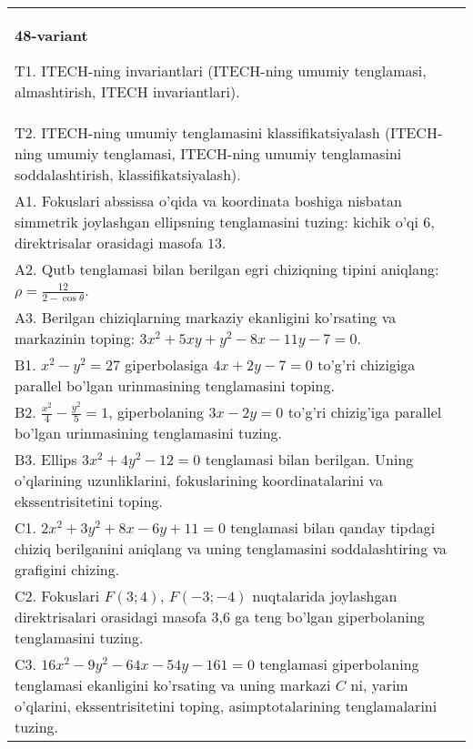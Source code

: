 \documentclass{article}
\begin{document}
\begin{tabular}{m{17cm}}
\textbf{48-variant}
\newline

T1. ITECH-ning invariantlari (ITECH-ning umumiy tenglamasi, almashtirish, ITECH invariantlari).\\

T2. ITECH-ning umumiy tenglamasini klassifikatsiyalash (ITECH-ning umumiy tenglamasi, ITECH-ning umumiy tenglamasini soddalashtirish, klassifikatsiyalash).\\

A1. Fokuslari abssissa o'qida va koordinata boshiga nisbatan simmetrik joylashgan ellipsning tenglamasini tuzing: kichik o'qi $6$, direktrisalar orasidagi masofa $13$.\\

A2. Qutb tenglamasi bilan berilgan egri chiziqning tipini aniqlang: $\rho=\frac{12}{2-\cos\theta}$.\\

A3. Berilgan chiziqlarning markaziy ekanligini ko'rsating va markazinin toping: $3x^{2}+5xy+y^{2}-8x-11y-7=0$.\\

B1. $x^{2} - y^{2} = 27$ giperbolasiga $4x + 2y - 7 = 0$ to'g'ri chizigiga parallel bo'lgan urinmasining tenglamasini toping.  \\

B2. $\frac{x^{2}}{4} - \frac{y^{2}}{5} = 1$, giperbolaning $3x - 2y = 0$ to'g'ri chizig'iga parallel bo'lgan urinmasining tenglamasini tuzing.  \\

B3. Ellips $3x^{2} + 4y^{2} - 12 = 0$ tenglamasi bilan berilgan. Uning o'qlarining uzunliklarini, fokuslarining koordinatalarini va ekssentrisitetini toping.  \\

C1. $2x^{2} + 3y^{2} + 8x - 6y + 11 = 0$ tenglamasi bilan qanday tipdagi chiziq berilganini aniqlang va uning tenglamasini soddalashtiring va grafigini chizing.  \\

C2. Fokuslari $F(3;4)$, $F(-3;-4)$ nuqtalarida joylashgan direktrisalari orasidagi masofa 3,6 ga teng bo'lgan giperbolaning tenglamasini tuzing.  \\

C3. $16x^{2} - 9y^{2} - 64x - 54y - 161 = 0$ tenglamasi giperbolaning tenglamasi ekanligini ko'rsating va uning markazi $C$ ni, yarim o'qlarini, ekssentrisitetini toping, asimptotalarining tenglamalarini tuzing.  \\

\end{tabular}
\vspace{1cm}
\end{document}
